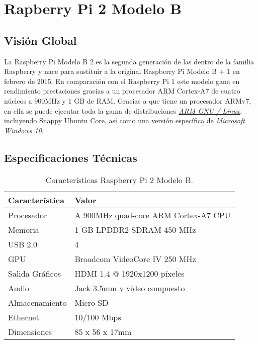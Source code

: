 \chapter{Rapberry Pi 2 Modelo B}
\label{chap:anexo5}

\section{Visión Global}

La Raspberry Pi Modelo B 2 es la segunda generación de las dentro de la familia Raspberry y nace para sustituir a la original Raspberry Pi Modelo B + 1 en febrero de 2015. En comparación con el Raspberry Pi 1 este modelo gana en rendimiento prestaciones gracias a un procesador ARM Cortex-A7 de cuatro núcleos  a 900MHz y 1 GB de RAM. Gracias a que tiene un procesador ARMv7, en ella se puede ejecutar toda la gama de distribuciones \href{https://www.raspberrypi.org/downloads/}{\textit{ARM GNU / Linux}}, incluyendo Snappy Ubuntu Core, así como una versión específica de \href{https://developer.microsoft.com/es-es/windows/iot}{\textit{Microsoft Windows 10}}.

\section{Especificaciones Técnicas}

\begin{table}[h!]
  \centering
  \caption{Características Raspberry Pi 2 Modelo B. \cite{RaspberryPi2ModelB}}
  \label{tab:raspberrypi2}
  \begin{tabular}{p{}p{}}
    \hline
    \textbf{Característica} & \textbf{Valor} \\
    \hline
    Procesador & A 900MHz quad-core ARM Cortex-A7 CPU\\
    Memoria & 1 GB LPDDR2 SDRAM 450 MHz \\
    USB 2.0 & 4 \\
    GPU & Broadcom VideoCore IV 250 MHz \\
    Salida Gráficos & HDMI 1.4 @ 1920x1200 píxeles \\
    Audio & Jack 3.5mm y vídeo compuesto \\
    Almacenamiento & Micro SD \\
    Ethernet & 10/100 Mbps \\
    Dimensiones & 85 x 56 x 17mm \\
    \hline
  \end{tabular}
\end{table}